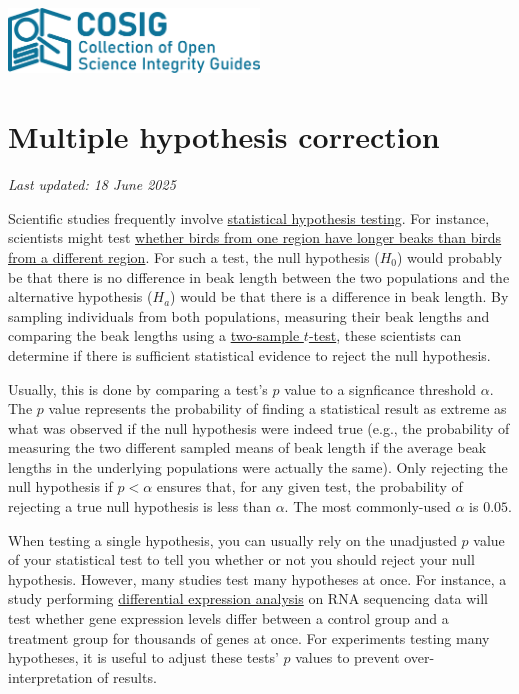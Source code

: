 \documentclass[letterpaper, 12pt]{article}
\begin{document}
\flushleft
\includegraphics[width=0.5\textwidth]{img/home/241017_final_logo_mockup.png}

\section*{Multiple hypothesis correction}
\textit{Last updated: 18 June 2025}

Scientific studies frequently involve \href{https://www.britannica.com/science/statistics/Hypothesis-testing}{statistical hypothesis testing}. For instance, scientists might test \href{https://doi.org/10.1038/s41598-023-49623-y}{whether birds from one region have longer beaks than birds from a different region}. For such a test, the null hypothesis ($H_0$) would probably be that there is no difference in beak length between the two populations and the alternative hypothesis ($H_a$) would be that there is a difference in beak length. By sampling individuals from both populations, measuring their beak lengths and comparing the beak lengths using a \href{https://en.wikipedia.org/wiki/Student%27s_t-test}{two-sample $t$-test}, these scientists can determine if there is sufficient statistical evidence to reject the null hypothesis. 

Usually, this is done by comparing a test's $p$ value to a signficance threshold $\alpha$. The $p$ value represents the probability of finding a statistical result as extreme as what was observed if the null hypothesis were indeed true (e.g., the probability of measuring the two different sampled means of beak length if the average beak lengths in the underlying populations were actually the same). Only rejecting the null hypothesis if $p < \alpha$ ensures that, for any given test, the probability of rejecting a true null hypothesis is less than $\alpha$. The most commonly-used $\alpha$ is $0.05$.

When testing a single hypothesis, you can usually rely on the unadjusted $p$ value of your statistical test to tell you whether or not you should reject your null hypothesis. However, many studies test many hypotheses at once. For instance, a study performing \href{https://www.ebi.ac.uk/training/online/courses/functional-genomics-ii-common-technologies-and-data-analysis-methods/rna-sequencing/performing-a-rna-seq-experiment/data-analysis/differential-gene-expression-analysis/#:~:text=Differential%20expression%20analysis%20means%20taking,expression%20levels%20between%20experimental%20groups}{differential expression analysis} on RNA sequencing data will test whether gene expression levels differ between a control group and a treatment group for thousands of genes at once. For experiments testing many hypotheses, it is useful to adjust these tests' $p$ values to prevent over-interpretation of results.
\end{document}

